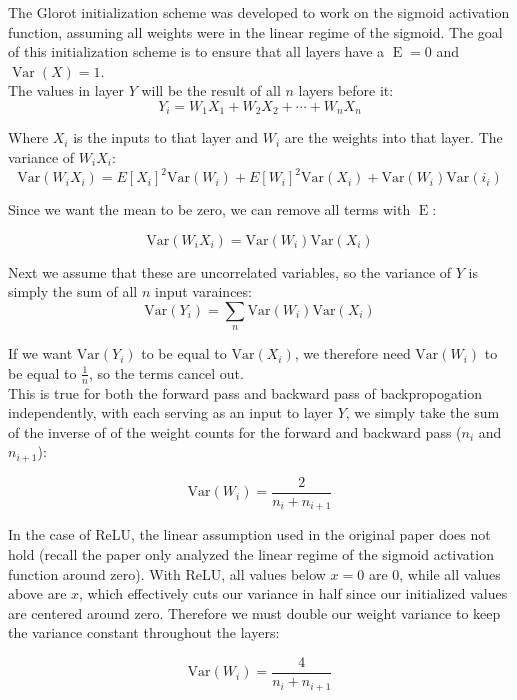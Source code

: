 \documentclass{amsart}
\theoremstyle{definition}
\theoremstyle{remark}
\numberwithin{equation}{section}
\begin{document}
The Glorot initialization scheme was developed to work on the sigmoid
activation function, assuming all weights were in the linear regime of the
sigmoid. The goal of this initialization scheme is to ensure that all layers
have a $\operatorname{E} = 0$ and $\operatorname{Var}(X) = 1$. \\

The values in layer $Y$ will be the result of all $n$ layers before it: \\

\begin{equation}
Y_i = W_1X_1 + W_2X_2 + \dotsb + W_n X_n
\end{equation}

Where $X_i$ is the inputs to that layer and $W_i$ are the weights into that layer.
The variance of $W_iX_i$: \\

\begin{equation}
\text{Var}(W_iX_i) = E[X_i]^2 \text{Var}(W_i) + E[W_i]^2 \text{Var}(X_i) + \text{Var}(W_i)\text{Var}(i_i)
\end{equation}

Since we want the mean to be zero, we can remove all terms with $\operatorname{E}$:

\begin{equation}
\text{Var}(W_iX_i) = \text{Var}(W_i)\text{Var}(X_i)
\end{equation}

Next we assume that these are uncorrelated variables, so the variance of $Y$ is
simply the sum of all $n$ input varainces:\\

\begin{equation}
\text{Var}(Y_i) = \sum_n{\text{Var}(W_i)\text{Var}(X_i)}
\end{equation}

If we want $\text{Var}(Y_i)$ to be equal to $\text{Var}(X_i)$, we therefore need
$\text{Var}(W_i)$ to be equal to $\frac{1}{n}$, so the terms cancel out. \\

This is true for both the forward pass and backward pass of backpropogation
independently, with each serving as an input to layer $Y$, we simply take the
sum of the inverse of of the weight counts for the forward and backward pass
($n_{i}$ and $n_{i+1}$):

\begin{equation}
\text{Var}(W_i) = \frac{2}{n_{i} + n_{i+1}}
\end{equation}

In the case of ReLU, the linear assumption used in the original paper does not
hold (recall the paper only analyzed the linear regime of the sigmoid activation
function around zero). With ReLU, all values below $x = 0$ are 0, while all
values above are $x$, which effectively cuts our variance in half since our
initialized values are centered around zero. Therefore we must double our weight
variance to keep the variance constant throughout the layers:

\begin{equation}
\text{Var}(W_i) = \frac{4}{n_{i} + n_{i+1}}
\end{equation}
\end{document}

